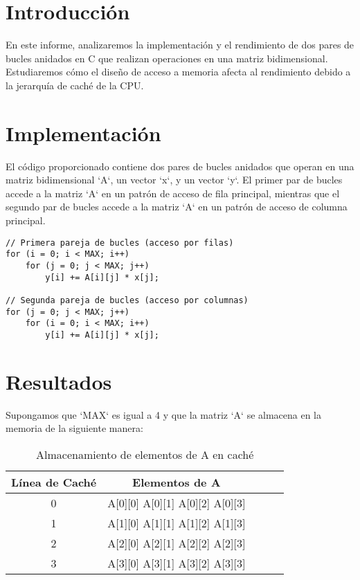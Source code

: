 
\section{Introducción}
En este informe, analizaremos la implementación y el rendimiento de dos pares de bucles anidados en C que realizan operaciones en una matriz bidimensional. Estudiaremos cómo el diseño de acceso a memoria afecta al rendimiento debido a la jerarquía de caché de la CPU.

\section{Implementación}
El código proporcionado contiene dos pares de bucles anidados que operan en una matriz bidimensional `A`, un vector `x`, y un vector `y`. El primer par de bucles accede a la matriz `A` en un patrón de acceso de fila principal, mientras que el segundo par de bucles accede a la matriz `A` en un patrón de acceso de columna principal.

\begin{lstlisting}
// Primera pareja de bucles (acceso por filas)
for (i = 0; i < MAX; i++)
    for (j = 0; j < MAX; j++)
        y[i] += A[i][j] * x[j];

// Segunda pareja de bucles (acceso por columnas)
for (j = 0; j < MAX; j++)
    for (i = 0; i < MAX; i++)
        y[i] += A[i][j] * x[j];
\end{lstlisting}

\section{Resultados}
Supongamos que `MAX` es igual a 4 y que la matriz `A` se almacena en la memoria de la siguiente manera:

\begin{table}[h]
\centering
\begin{tabular}{|c|c|c|c|c|}
\hline
\textbf{Línea de Caché} & \textbf{Elementos de A} \\
\hline
0 & A[0][0] A[0][1] A[0][2] A[0][3] \\
1 & A[1][0] A[1][1] A[1][2] A[1][3] \\
2 & A[2][0] A[2][1] A[2][2] A[2][3] \\
3 & A[3][0] A[3][1] A[3][2] A[3][3] \\
\hline
\end{tabular}
\caption{Almacenamiento de elementos de A en caché}
\end{table}


